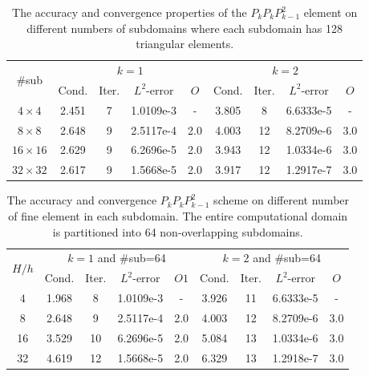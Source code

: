 		\vspace{5mm}
		\begin{table}[H]
			\setlength{\tabcolsep}{1pt} {
				\begin{center}
					\begin{tabular}{c|cccc|cccc}
						\hline
						\multirow{2}{*}{\#sub} &\multicolumn{4}{c|}{$k=1$} &\multicolumn{4}{c}{$k=2$}\\ 
						& Cond.   & Iter. &$L^2$-error & $O$ & Cond.   & Iter. &$L^2$-error & $O$\\
						\hline
						$4\times 4$ & 2.451 & 7 & 1.0109e-3 & - &3.805 &8 &6.6333e-5  &- \\
						$8\times 8$ &2.648 &9 &2.5117e-4 &	2.0  &4.003 &12 &8.2709e-6  & 3.0 \\
						$16\times 16$ &2.629 &9 &	6.2696e-5 &2.0  &3.943 &12 &1.0334e-6  &3.0\\
						$32\times 32$ &2.617 &9 &1.5668e-5 &2.0  &3.917 &12 &1.2917e-7  &3.0\\
						\hline
					\end{tabular}
					\caption{The accuracy and convergence properties of the $P_{k}P_{k}P_{k-1}^2$ element on different numbers of subdomains where each subdomain has 128 triangular elements.}
					\label{Tab:case1_PkPkPk-1 Row1}
				\end{center} }
			\end{table}
			
			\vspace{5mm}
			\begin{table}[H]
				\setlength{\tabcolsep}{1pt} {
					\begin{center}
						\begin{tabular}{c|cccc|cccc}
							\hline
							\multirow{2}{*}{$H/h$} &\multicolumn{4}{c|}{$k=1$ and \#sub=64}  &\multicolumn{4}{c}{$k=2$ and \#sub=64}\\ 
							& Cond.   & Iter. &$L^2$-error & $O1$ & Cond.   & Iter. &$L^2$-error & $O$\\
							\hline
							$4$ &1.968 &8 &1.0109e-3 &-&3.926 &11 &6.6333e-5  &-\\
							8 &2.648 &9 &2.5117e-4 &2.0 &4.003 &12 &8.2709e-6  &3.0 \\
							16 &3.529 &10 &6.2696e-5 &2.0  &5.084 &13 &1.0334e-6  &3.0\\
							32 &4.619 &12 &1.5668e-5 &2.0  &6.329 &13 &1.2918e-7  &3.0\\
							\hline
						\end{tabular}
					\end{center} }
					\caption{The accuracy and convergence  $P_{k}P_{k}P_{k-1}^2$ scheme on different number of fine element in each subdomain. The entire computational domain is partitioned into 64 non-overlapping subdomains.}
					\label{Tab:case1_PkPkPk-1Row2}
				\end{table}						
				
